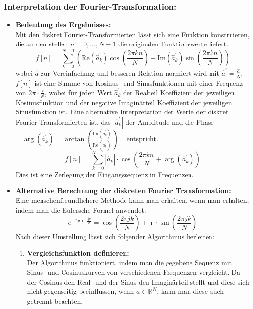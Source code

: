\subsubsection{\textbf{Interpretation der Fourier-Transformation:}}
\begin{itemize}
	\item \textbf{Bedeutung des Ergebnisses:}\\
	Mit den diskret Fourier-Transformierten lässt sich eine Funktion konstruieren, die an den stellen \(n = 0,\dots,N-1\) die originalen Funktionswerte liefert.
	\[f[n] = \sum_{k=0}^{N-1}\left(\text{Re}(\hat{a}^\prime_k)\cos\left(\frac{2\pi kn}{N}\right)+\text{Im}(\hat{a}^\prime_k)\sin\left(\frac{2\pi kn}{N}\right)\right)\]
	wobei \(\hat{a}\) zur Vereinfachung und besseren Relation normiert wird mit \(\hat{a}^\prime = \frac{\hat{a}}{N}\).
	\(f[n]\) ist eine Summe von Kosinus- und Sinusfunktionen mit einer Frequenz von \(2\pi\cdot\frac{k}{N}\), wobei für jeden Wert \(\hat{a}^\prime_k\) der Realteil Koeffizient der jeweiligen Kosinusfunktion und der negative Imaginärteil Koeffizient der jeweiligen Sinusfunktion ist.
	Eine alternative Interpretation der Werte der diskret Fourier-Transformierten ist, das \(\left\lvert \hat{a}^\prime_k\right\rvert \) der Amplitude und die Phase \(\quad\arg(\hat{a}^\prime_k) = \arctan\left(\frac{\text{Im}(\hat{a}^\prime_k)}{\text{Re}(\hat{a}^\prime_k)}\right)\quad \) entspricht.
	\[f[n] = \sum_{k=0}^{N-1}\left\lvert\hat{a}^\prime_k\right\rvert\cdot\cos\left(\frac{2\pi kn}{N}+\arg(\hat{a}^\prime_k)\right)\]
	Dies ist eine Zerlegung der Eingangssequenz in Frequenzen.
	\item \textbf{Alternative Berechnung der diskreten Fourier Transformation:}\\
	Eine menschenfreundlichere Methode kann man erhalten, wenn man erhalten, indem man die Eulersche Formel anwendet:
	\[e^{-2\pi \imath \cdot\frac{jk}{N}} = \cos\left(\frac{2\pi jk}{N}\right) + \imath\cdot\sin\left(\frac{2\pi jk}{N}\right)\]
	Nach dieser Umstellung lässt sich folgender Algorithmus herleiten:
	\begin{enumerate}
		\item \textbf{Vergleichsfunktion definieren:}\\%
		Der Algorithmus funktioniert, indem man die gegebene Sequenz mit Sinus- und Cosinuskurven von verschiedenen Frequenzen vergleicht. \cite{reducible_discrete_2023} Da der Cosinus den Real- und der Sinus den Imaginärteil stellt und diese sich nicht gegenseitig beeinflussen, wenn \(a \in \mathbb{R}^N\), kann man diese auch getrennt beachten.

\end{enumerate}
\end{itemize}
